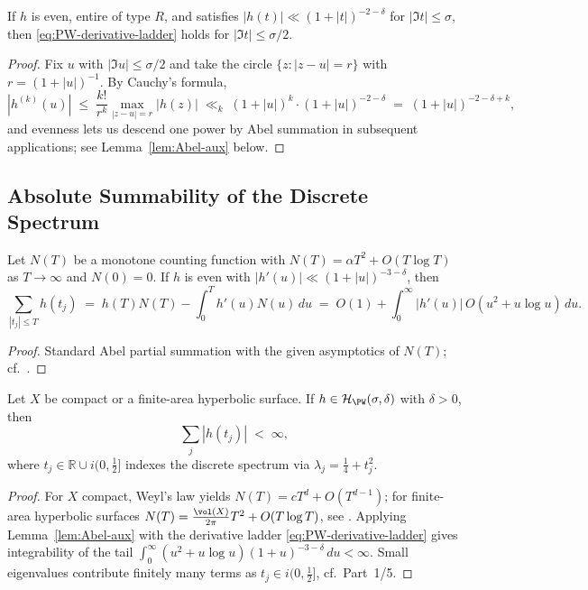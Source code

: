 \begin{lemma} \label{lem:Cauchy-derivatives} %
If $h$ is even, entire of type $R$, and satisfies $|h(t)|\ll (1+|t|)^{-2-\delta}$ for $|\Im t|\le\sigma$, then \eqref{eq:PW-derivative-ladder} holds for $|\Im t|\le \sigma/2$. %
\end{lemma}

\begin{proof}
Fix $u$ with $|\Im u|\le \sigma/2$ and take the circle $\{z:|z-u|=r\}$ with $r=(1+|u|)^{-1}$. By Cauchy's formula, %
\[
  |h^{(k)}(u)| \;\le\; \frac{k!}{r^k}\max_{|z-u|=r}|h(z)|
  \;\ll_k\; (1+|u|)^k \cdot (1+|u|)^{-2-\delta}
  \;=\; (1+|u|)^{-2-\delta+k}, %
\]
and evenness lets us descend one power by Abel summation in subsequent applications; see Lemma~\ref{lem:Abel-aux} below. %
\end{proof}

\subsection{Absolute Summability of the Discrete Spectrum} \label{subsec:absolute-summability} \relax \hspace{0pt} %

\begin{lemma} \label{lem:Abel-aux} %
Let $N(T)$ be a monotone counting function with $N(T)=\alpha T^2 + O(T\log T)$ as $T\to\infty$ and $N(0)=0$. If $h$ is even with $|h'(u)|\ll (1+|u|)^{-3-\delta}$, then
\[
  \sum_{|t_j|\le T} h(t_j) \;=\; h(T)N(T) - \int_0^T h'(u)N(u)\,du \;=\; O(1) + \int_0^\infty |h'(u)|\,O(u^2\!+\!u\log u)\,du. %
\]
\end{lemma}

\begin{proof}
Standard Abel partial summation with the given asymptotics of $N(T)$; cf.\ \cite[Ch.~4]{HejhalII}. %
\end{proof}

\begin{theorem} \label{thm:AbsSum} %
Let $X$ be compact or a finite-area hyperbolic surface. If $h\in\mathcal{H}_{\PW}(\sigma,\delta)$ with $\delta>0$, then
\[
  \sum_{j} |h(t_j)| \;<\; \infty,
\]
where $t_j\in\mathbb R\cup i(0,\tfrac12]$ indexes the discrete spectrum via $\lambda_j=\tfrac14+t_j^2$. %
\end{theorem}

\begin{proof}
For $X$ compact, Weyl's law yields $N(T)=cT^d+O(T^{d-1})$; for finite-area hyperbolic surfaces $N(T)=\frac{\vol(X)}{2\pi}T^2 + O(T\log T)$, see \cite{Selberg1956, HejhalII}. Applying Lemma~\ref{lem:Abel-aux} with the derivative ladder \eqref{eq:PW-derivative-ladder} gives integrability of the tail $\int_0^\infty (u^2+u\log u)(1+u)^{-3-\delta}\,du<\infty$. Small eigenvalues contribute finitely many terms as $t_j\in i(0,\tfrac12]$, cf.\ Part~1/5. %
\end{proof}

